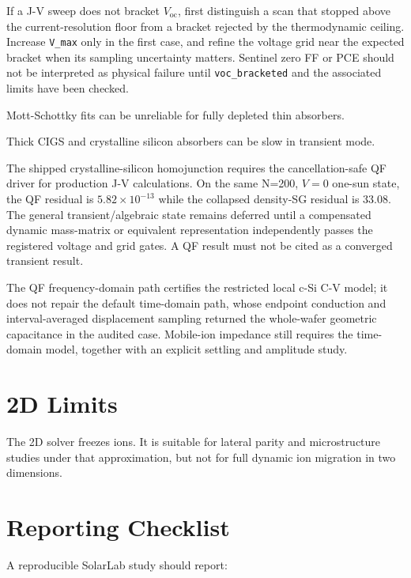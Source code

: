 \documentclass[
  11pt,
  american,
]{report}
\begin{document}
If a J-V sweep does not bracket \(V_\mathrm{oc}\), first distinguish a
scan that stopped above the current-resolution floor from a bracket
rejected by the thermodynamic ceiling. Increase \texttt{V\_max} only in
the first case, and refine the voltage grid near the expected bracket
when its sampling uncertainty matters. Sentinel zero FF or PCE should
not be interpreted as physical failure until \texttt{voc\_bracketed} and
the associated limits have been checked.

Mott-Schottky fits can be unreliable for fully depleted thin absorbers.

Thick CIGS and crystalline silicon absorbers can be slow in transient
mode.

The shipped crystalline-silicon homojunction requires the
cancellation-safe QF driver for production J-V calculations. On the same
N=200, \(V=0\) one-sun state, the QF residual is \(5.82\times10^{-13}\)
while the collapsed density-SG residual is 33.08. The general
transient/algebraic state remains deferred until a compensated dynamic
mass-matrix or equivalent representation independently passes the
registered voltage and grid gates. A QF result must not be cited as a
converged transient result.

The QF frequency-domain path certifies the restricted local c-Si C-V
model; it does not repair the default time-domain path, whose endpoint
conduction and interval-averaged displacement sampling returned the
whole-wafer geometric capacitance in the audited case. Mobile-ion
impedance still requires the time-domain model, together with an
explicit settling and amplitude study.

\hypertarget{d-limits}{%
\section{2D Limits}\label{d-limits}}

The 2D solver freezes ions. It is suitable for lateral parity and
microstructure studies under that approximation, but not for full
dynamic ion migration in two dimensions.

\hypertarget{reporting-checklist}{%
\section{Reporting Checklist}\label{reporting-checklist}}

A reproducible SolarLab study should report:
\end{document}

